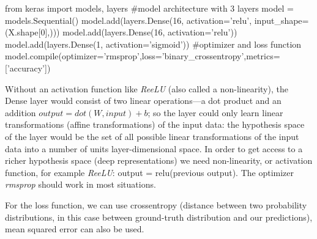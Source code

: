 \documentclass[11pt]{article}
\begin{document}
\begin{code}[caption=Deep network 3 layers, label=deepkeras]
from keras import models, layers
#model architecture with 3 layers
model = models.Sequential()
model.add(layers.Dense(16, activation='relu', input_shape=(X.shape[0],)))
model.add(layers.Dense(16, activation='relu'))
model.add(layers.Dense(1, activation='sigmoid'))
#optimizer and loss function
model.compile(optimizer='rmsprop',loss='binary_crossentropy',metrics=['accuracy'])

\end{code}
Without an activation function like \emph{ReeLU} (also called a non-linearity), the Dense layer would consist of two linear operations—a dot product and an addition $output = dot(W, input) + b$; so the layer could only learn linear transformations (affine transformations) of the input data: the hypothesis space of the layer would be the set of all possible linear transformations of the input data into a number of units layer-dimensional space. 
In order to get access to a richer hypothesis space (deep representations) we need non-linearity, or activation function, for example \emph{ReeLU}: output = relu(previous output). The optimizer \textit{rmsprop} should work in most situations.

For the loss function, we can use crossentropy (distance between two probability distributions, in this case between ground-truth distribution and our predictions), mean squared error can also be used. 


\end{document}
